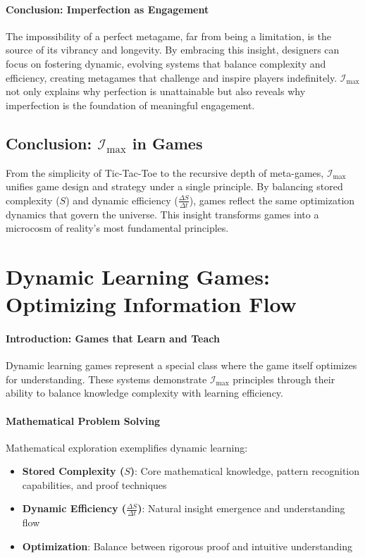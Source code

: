 \documentclass[12pt]{article}
\begin{document}
\paragraph{Conclusion: Imperfection as Engagement}
The impossibility of a perfect metagame, far from being a limitation, is the source of its vibrancy and longevity. By embracing this insight, designers can focus on fostering dynamic, evolving systems that balance complexity and efficiency, creating metagames that challenge and inspire players indefinitely. \(\mathcal{I}_{\text{max}}\) not only explains why perfection is unattainable but also reveals why imperfection is the foundation of meaningful engagement.

\subsection{Conclusion: \(\mathcal{I}_{\text{max}}\) in Games}
From the simplicity of Tic-Tac-Toe to the recursive depth of meta-games, \(\mathcal{I}_{\text{max}}\) unifies game design and strategy under a single principle. By balancing stored complexity (\(S\)) and dynamic efficiency (\(\frac{\Delta S}{\Delta t}\)), games reflect the same optimization dynamics that govern the universe. This insight transforms games into a microcosm of reality’s most fundamental principles.


\section{Dynamic Learning Games: Optimizing Information Flow}

\paragraph{Introduction: Games that Learn and Teach}
Dynamic learning games represent a special class where the game itself optimizes for understanding. These systems demonstrate \(\mathcal{I}_{\text{max}}\) principles through their ability to balance knowledge complexity with learning efficiency.

\paragraph{Mathematical Problem Solving}
Mathematical exploration exemplifies dynamic learning:
\begin{itemize}
    \item \textbf{Stored Complexity (\(S\))}: Core mathematical knowledge, pattern recognition capabilities, and proof techniques
    \item \textbf{Dynamic Efficiency (\(\frac{\Delta S}{\Delta t}\))}: Natural insight emergence and understanding flow
    \item \textbf{Optimization}: Balance between rigorous proof and intuitive understanding
\end{itemize}
\end{document}

